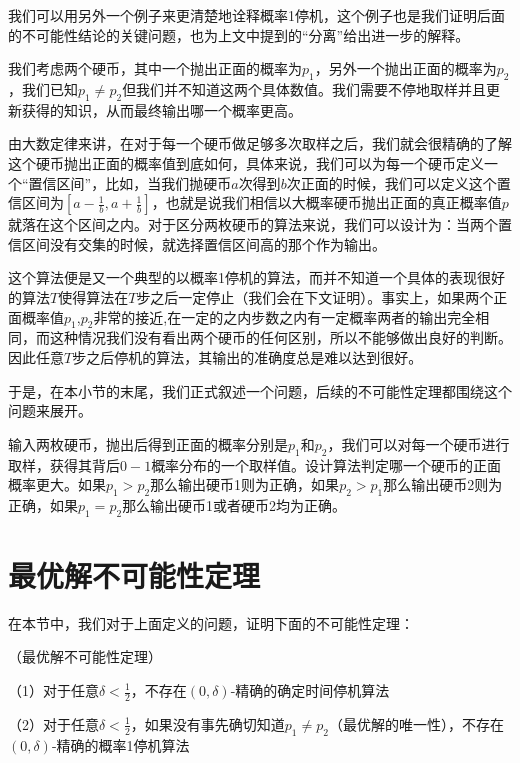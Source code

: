 \documentclass[bachelor]{thuthesis}
\begin{document}
我们可以用另外一个例子来更清楚地诠释概率1停机，这个例子也是我们证明后面的不可能性结论的关键问题，也为上文中提到的“分离”给出进一步的解释。

我们考虑两个硬币，其中一个抛出正面的概率为$p_1$，另外一个抛出正面的概率为$p_2$，我们已知$p_1\ne p_2$但我们并不知道这两个具体数值。我们需要不停地取样并且更新获得的知识，从而最终输出哪一个概率更高。

由大数定律来讲，在对于每一个硬币做足够多次取样之后，我们就会很精确的了解这个硬币抛出正面的概率值到底如何，具体来说，我们可以为每一个硬币定义一个“置信区间”，比如，当我们抛硬币$a$次得到$b$次正面的时候，我们可以定义这个置信区间为$[a-\frac{1}{b},a+\frac{1}{b}]$，也就是说我们相信以大概率硬币抛出正面的真正概率值$p$就落在这个区间之内。对于区分两枚硬币的算法来说，我们可以设计为：当两个置信区间没有交集的时候，就选择置信区间高的那个作为输出。

这个算法便是又一个典型的以概率1停机的算法，而并不知道一个具体的表现很好的算法$T$使得算法在$T$步之后一定停止（我们会在下文证明）。事实上，如果两个正面概率值$p_1$,$p_2$非常的接近,在一定的之内步数之内有一定概率两者的输出完全相同，而这种情况我们没有看出两个硬币的任何区别，所以不能够做出良好的判断。因此任意$T$步之后停机的算法，其输出的准确度总是难以达到很好。

于是，在本小节的末尾，我们正式叙述一个问题，后续的不可能性定理都围绕这个问题来展开。

\begin{problem}

输入两枚硬币，抛出后得到正面的概率分别是$p_1$和$p_2$，我们可以对每一个硬币进行取样，获得其背后$0-1$概率分布的一个取样值。设计算法判定哪一个硬币的正面概率更大。如果$p_1>p_2$那么输出硬币1则为正确，如果$p_2>p_1$那么输出硬币2则为正确，如果$p_1=p_2$那么输出硬币1或者硬币2均为正确。

\end{problem}


\section{最优解不可能性定理}


在本节中，我们对于上面定义的问题，证明下面的不可能性定理：

\begin{theorem}（最优解不可能性定理）
\label{thm:impoadd}

（1）对于任意$\delta<\frac{1}{2}$，不存在$(0,\delta)$-精确的确定时间停机算法

（2）对于任意$\delta<\frac{1}{2}$，如果没有事先确切知道$p_1\ne p_2$（最优解的唯一性），不存在$(0,\delta)$-精确的概率1停机算法

\end{theorem}
\end{document}
